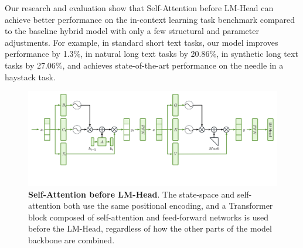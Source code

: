 \documentclass{article}
\theoremstyle{plain}
\theoremstyle{definition}
\theoremstyle{remark}
\begin{document}
Our research and evaluation show that Self-Attention before LM-Head can achieve better performance on the in-context learning task benchmark compared to the baseline hybrid model with only a few structural and parameter adjustments. For example, in standard short text tasks, our model improves performance by 1.3\%, in natural long text tasks by 20.86\%, in synthetic long text tasks by 27.06\%, and achieves state-of-the-art performance on the needle in a haystack task.

\begin{figure}[ht]
   \centering
   \includegraphics[width=\linewidth]{fig/architecture.pdf}
   \caption{
     \textbf{Self-Attention before LM-Head}.
      The state-space and self-attention both use the same positional encoding, and a Transformer block composed of self-attention and feed-forward networks is used before the LM-Head, regardless of how the other parts of the model backbone are combined.
   }
   \label{fig:architecture}
\end{figure}




\end{document}
